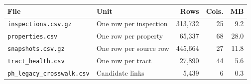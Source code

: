 \begin{tabular}{@{}llrrr@{}}
\toprule
File & Unit & Rows & Cols. & MB \\
\midrule
\texttt{inspections.csv.gz} & One row per inspection & 313,732 & 25 & 9.2 \\
\texttt{properties.csv} & One row per property & 65,337 & 68 & 28.0 \\
\texttt{snapshots.csv.gz} & One row per source row & 445,664 & 27 & 11.8 \\
\texttt{tract\_health.csv} & One row per tract & 27,890 & 44 & 5.6 \\
\texttt{ph\_legacy\_crosswalk.csv} & Candidate links & 5,439 & 6 & 0.3 \\
\bottomrule
\end{tabular}
